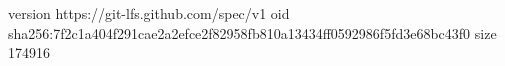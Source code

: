 version https://git-lfs.github.com/spec/v1
oid sha256:7f2c1a404f291cae2a2efce2f82958fb810a13434ff0592986f5fd3e68bc43f0
size 174916
